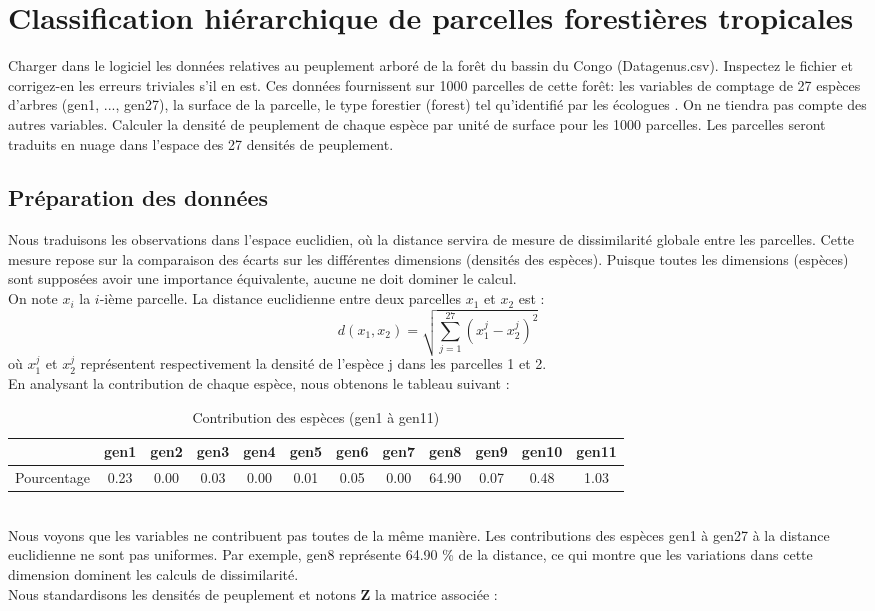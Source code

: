 \documentclass{article}
\begin{document}
\section{Classification hiérarchique de parcelles forestières tropicales}
Charger dans le logiciel les données relatives au peuplement arboré de la forêt du bassin du Congo
(Datagenus.csv). Inspectez le fichier et corrigez-en les erreurs triviales s'il en est. Ces données fournissent
sur 1000 parcelles de cette forêt: les variables de comptage de 27 espèces d'arbres (gen1, ..., gen27), la
surface de la parcelle, le type forestier (forest) tel qu'identifié par les écologues . On ne tiendra pas compte
des autres variables. Calculer la densité de peuplement de chaque espèce par unité de surface pour les 1000
parcelles. Les parcelles seront traduits en nuage dans l'espace des 27 densités de peuplement.

\subsection{Préparation des données}
\label{Q1}
Nous traduisons les observations dans l’espace euclidien, où la distance servira de mesure de dissimilarité globale entre les parcelles. Cette mesure repose sur la comparaison des écarts sur les différentes dimensions (densités des espèces). Puisque toutes les dimensions (espèces) sont supposées avoir une importance équivalente, aucune ne doit dominer le calcul.
\\
On note $x_i$ la $i$-ième parcelle. La distance euclidienne entre deux parcelles $x_1$ et $x_2$ est :  
\[
d(x_1, x_2) = \sqrt{\sum_{j=1}^{27} (x_1^j - x_2^j)^2}
\]
où \( x_1^j \) et \( x_2^j \) représentent respectivement la densité de l'espèce j dans les parcelles 1 et 2.
\\
En analysant la contribution de chaque espèce, nous obtenons le tableau suivant :
\begin{table}[h!]
    \centering
    \caption{Contribution des espèces (gen1 à gen11)}
    \label{tab:pourcentage}
    \begin{tabular}{@{}l*{11}{c}@{}}
    \toprule
     & gen1 & gen2 & gen3 & gen4 & gen5 & gen6 & gen7 & gen8 & gen9 & gen10 & gen11 \\ 
    \midrule
    Pourcentage & 
    0.23 & 0.00 & 0.03 & 0.00 & 0.01 & 0.05 & 0.00 & 64.90 & 0.07 & 0.48 & 1.03 \\ 
    \bottomrule
    \end{tabular}
    \end{table}
\\
Nous voyons que les variables ne contribuent pas toutes de la même manière. Les contributions des espèces gen1 à gen27 à la distance euclidienne ne sont pas uniformes. Par exemple, gen8 représente 64.90 \% de la distance, ce qui montre que les variations dans cette dimension dominent les calculs de dissimilarité.
\\
Nous standardisons les densités de peuplement et notons \( \mathbf{Z} \) la matrice associée :
\end{document}
